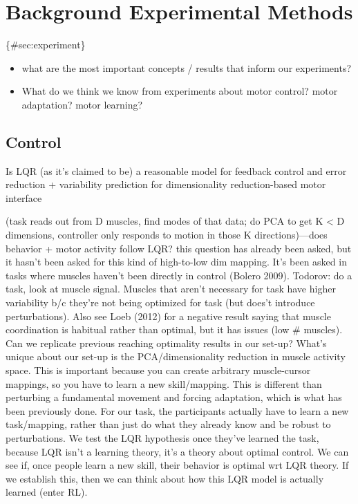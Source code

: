 \section{Background Experimental
Methods}\label{background-experimental-methods}

\{\#sec:experiment\}

\begin{itemize}
\tightlist
\item
  what are the most important concepts / results that inform our
  experiments?
\item
  What do we think we know from experiments about motor control? motor
  adaptation? motor learning?
\end{itemize}

\subsection{Control}\label{control}

Is LQR (as it's claimed to be) a reasonable model for feedback control
and error reduction + variability prediction for dimensionality
reduction-based motor interface

(task reads out from D muscles, find modes of that data; do PCA to get K
\textless{} D dimensions, controller only responds to motion in those K
directions)---does behavior + motor activity follow LQR? this question
has already been asked, but it hasn't been asked for this kind of
high-to-low dim mapping. It's been asked in tasks where muscles haven't
been directly in control (Bolero 2009). Todorov: do a task, look at
muscle signal. Muscles that aren't necessary for task have higher
variability b/c they're not being optimized for task (but does't
introduce perturbations). Also see Loeb (2012) for a negative result
saying that muscle coordination is habitual rather than optimal, but it
has issues (low \# muscles). Can we replicate previous reaching
optimality results in our set-up? What's unique about our set-up is the
PCA/dimensionality reduction in muscle activity space. This is important
because you can create arbitrary muscle-cursor mappings, so you have to
learn a new skill/mapping. This is different than perturbing a
fundamental movement and forcing adaptation, which is what has been
previously done. For our task, the participants actually have to learn a
new task/mapping, rather than just do what they already know and be
robust to perturbations. We test the LQR hypothesis once they've learned
the task, because LQR isn't a learning theory, it's a theory about
optimal control. We can see if, once people learn a new skill, their
behavior is optimal wrt LQR theory. If we establish this, then we can
think about how this LQR model is actually learned (enter RL).

